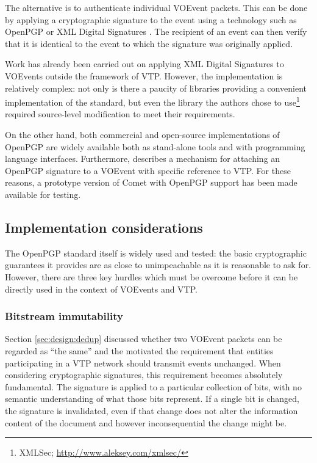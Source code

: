 \documentclass[5p,authoryear]{elsarticle}
\begin{document}
The alternative is to authenticate individual VOEvent packets. This can be
done by applying a cryptographic signature to the event using a technology
such as OpenPGP \citep{Callas:2007} or XML Digital Signatures
\citep{Bartel:2008}. The recipient of an event can then verify that it is
identical to the event to which the signature was originally applied.

Work has already been carried out on applying XML Digital Signatures to
VOEvents \citep{Allen:2008} outside the framework of VTP. However, the
implementation is relatively complex: not only is there a paucity of libraries
providing a convenient implementation of the standard, but even the library
the authors chose to use\footnote{XMLSec;
\url{http://www.aleksey.com/xmlsec/}} required source-level modification to
meet their requirements.

On the other hand, both commercial and open-source implementations of OpenPGP
are widely available both as stand-alone tools and with programming language
interfaces. Furthermore, \citet{Denny:2008} describes a mechanism for attaching
an OpenPGP signature to a VOEvent with specific reference to VTP. For these
reasons, a prototype version of Comet with OpenPGP support has been made
available for testing.

\subsection{Implementation considerations}

The OpenPGP standard itself is widely used and tested: the basic cryptographic
guarantees it provides are as close to unimpeachable as it is reasonable to
ask for. However, there are three key hurdles which must be overcome before it
can be directly used in the context of VOEvents and VTP.

\subsubsection{Bitstream immutability}

Section \ref{sec:design:dedup} discussed whether two VOEvent packets can be
regarded as ``the same'' and the motivated the requirement that entities
participating in a VTP network should transmit events unchanged. When
considering cryptographic signatures, this requirement becomes absolutely
fundamental. The signature is applied to a particular collection of bits, with
no semantic understanding of what those bits represent. If a single bit is
changed, the signature is invalidated, even if that change does not alter the
information content of the document and however inconsequential the change
might be.
\end{document}
